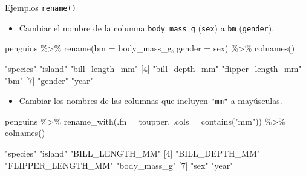 \documentclass[
  ignorenonframetext,
  aspectratio=169]{beamer}
\newenvironment{Shaded}{\begin{snugshade}}{\end{snugshade}}
\newcommand{\AttributeTok}[1]{\textcolor[rgb]{0.77,0.63,0.00}{#1}}
\newcommand{\FunctionTok}[1]{\textcolor[rgb]{0.00,0.00,0.00}{#1}}
\newcommand{\NormalTok}[1]{#1}
\newcommand{\SpecialCharTok}[1]{\textcolor[rgb]{0.00,0.00,0.00}{#1}}
\newcommand{\StringTok}[1]{\textcolor[rgb]{0.31,0.60,0.02}{#1}}
\providecommand{\tightlist}{%
  \setlength{\itemsep}{0pt}\setlength{\parskip}{0pt}}
\let\oldverbatim\verbatim
\let\endoldverbatim\endverbatim
\renewenvironment{verbatim}{\tiny\oldverbatim}{\endoldverbatim}
\begin{document}
\begin{frame}[fragile]{Ejemplos \texttt{rename()}}
\protect\hypertarget{ejemplos-rename}{}
\begin{itemize}
\tightlist
\item
  Cambiar el nombre de la columna \texttt{body\_mass\_g} (\texttt{sex})
  a \texttt{bm} (\texttt{gender}).
\end{itemize}

\begin{Shaded}
\begin{Highlighting}[]
\NormalTok{penguins }\SpecialCharTok{\%\textgreater{}\%} \FunctionTok{rename}\NormalTok{(}\AttributeTok{bm =}\NormalTok{ body\_mass\_g, }\AttributeTok{gender =}\NormalTok{ sex) }\SpecialCharTok{\%\textgreater{}\%} 
  \FunctionTok{colnames}\NormalTok{()}
\end{Highlighting}
\end{Shaded}

\begin{verbatim}
[1] "species"           "island"            "bill_length_mm"   
[4] "bill_depth_mm"     "flipper_length_mm" "bm"               
[7] "gender"            "year"             
\end{verbatim}

\begin{itemize}
\tightlist
\item
  Cambiar los nombres de las columnas que incluyen \texttt{"mm"} a
  mayúsculas.
\end{itemize}

\begin{Shaded}
\begin{Highlighting}[]
\NormalTok{penguins }\SpecialCharTok{\%\textgreater{}\%} \FunctionTok{rename\_with}\NormalTok{(}\AttributeTok{.fn =}\NormalTok{ toupper, }\AttributeTok{.cols =} \FunctionTok{contains}\NormalTok{(}\StringTok{"mm"}\NormalTok{)) }\SpecialCharTok{\%\textgreater{}\%} 
  \FunctionTok{colnames}\NormalTok{()}
\end{Highlighting}
\end{Shaded}

\begin{verbatim}
[1] "species"           "island"            "BILL_LENGTH_MM"   
[4] "BILL_DEPTH_MM"     "FLIPPER_LENGTH_MM" "body_mass_g"      
[7] "sex"               "year"             
\end{verbatim}
\end{frame}
\end{document}
